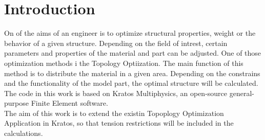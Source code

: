 \chapter{Introduction}
On of the aims of an engineer is to optimize structural properties, weight or the behavior of a given structure. Depending on the field of intrest, certain parameters and properties of the material and part can be adjusted. One of those optimization methods i the Topology Optiization. The main function of this method is to distribute the material in a given area. Depending on the constrains and the functionality of the model part, the optimal structure will be calculated.\\
The code in this work is based on Kratos Multiphysics, an open-source general-purpose Finite Element software.\\
The aim of this work is to extend the existin Topoplogy Optimization Application in Kratos, so that tension restrictions will be included in the calculations.\cite{Goldberg1989}\cite{Le2010}